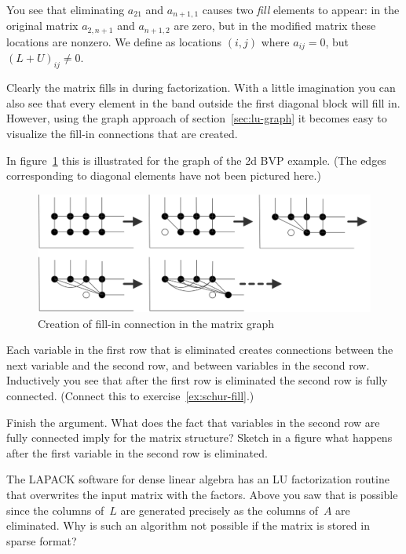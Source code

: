 You see that eliminating $a_{21}$ and $a_{n+1,1}$ causes two
\emph{fill} elements to appear: in the original matrix $a_{2,n+1}$ and
$a_{n+1,2}$ are zero, but in the modified matrix these locations
are nonzero.  We define  as
locations $(i,j)$ where $a_{ij}=0$, but~$(L+U)_{ij}\not=0$.

Clearly the matrix fills in during factorization. With a
little imagination you can also see that every element in the band
outside the first diagonal block will fill in. However, using the
graph approach of section~\ref{sec:lu-graph} it becomes easy to
visualize the fill-in connections that are created.

In figure~\ref{fig:row-eliminate} this is illustrated for the 
graph of the 2d \ac{BVP} example. (The edges corresponding to diagonal
elements have not been pictured here.)
\begin{figure}
  \includegraphics[scale=.2]{graphics/row-eliminate}
  \caption{Creation of fill-in connection in the matrix graph}
  \label{fig:row-eliminate}
\end{figure}
Each variable in the first row that is eliminated creates connections
between the next variable and the second row, and between variables in
the second row. Inductively you see that after the first row is
eliminated the second row is fully connected. (Connect this to
exercise~\ref{ex:schur-fill}.)

\begin{exercise}
  Finish the argument. What does the fact that variables in the second
  row are fully connected imply for the matrix structure? Sketch in a
  figure what happens after the first variable in the second row is
  eliminated.
\end{exercise}

\begin{exercise}
  The LAPACK software for dense linear algebra has an LU factorization
  routine that overwrites the input matrix with the factors. Above you
  saw that is possible since the columns of~$L$ are generated
  precisely as the columns of~$A$ are eliminated. Why is such an
  algorithm not possible if the matrix is stored in sparse format?
\end{exercise}

